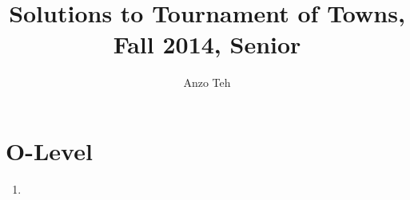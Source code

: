 \documentclass[11pt,a4paper]{article}
\begin{document}
\newcommand{\la}{\leftarrow}
\newcommand{\lra}{\leftrightarrow}
\newcommand{\bbN}{\mathbb{N}}
\newcommand{\bbZ}{\mathbb{Z}}
\newcommand{\dsum}{\displaystyle\sum}
\newcommand{\dprod}{\displaystyle\prod}


\title{Solutions to Tournament of Towns, Fall 2014, Senior}
\author{Anzo Teh}
\date{}
\maketitle

\section*{O-Level}
\begin{enumerate}
	\item
\end{enumerate}
\end{document}
